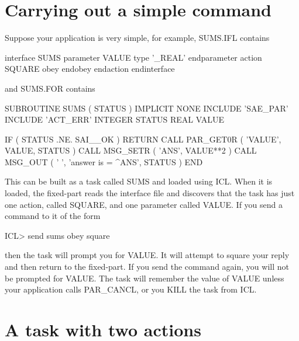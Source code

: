 \documentclass[twoside,11pt,nolof]{starlink}
\begin{document}
\section{Carrying out a simple command}

Suppose your application is very simple, for example, SUMS.IFL contains

\begin{small}
\begin{terminalv}
interface SUMS
   parameter VALUE
      type '_REAL'
   endparameter
   action SQUARE
      obey
      endobey
   endaction
endinterface
\end{terminalv}
\end{small}

and SUMS.FOR contains

\begin{small}
\begin{terminalv}
      SUBROUTINE SUMS ( STATUS )
      IMPLICIT NONE
      INCLUDE 'SAE_PAR'
      INCLUDE 'ACT_ERR'
      INTEGER STATUS
      REAL VALUE

      IF ( STATUS .NE. SAI__OK ) RETURN
      CALL PAR_GET0R ( 'VALUE', VALUE, STATUS )
      CALL MSG_SETR ( 'ANS', VALUE**2 )
      CALL MSG_OUT ( ' ', 'answer is = ^ANS', STATUS )
      END
\end{terminalv}
\end{small}

This can be built as a task called SUMS and loaded using ICL. When it is
loaded, the fixed-part reads the interface file and discovers that the
task has just one action, called SQUARE, and one parameter called VALUE.
If you send a command to it of the form

\begin{small}
\begin{terminalv}
ICL> send sums obey square
\end{terminalv}
\end{small}

then the task will prompt you for VALUE. It will attempt to square your
reply and then return to the fixed-part. If you send the command again,
you will not be prompted for VALUE. The task will remember the value of
VALUE unless your application calls PAR\_CANCL, or you KILL the task
from ICL.

\section{A task with two actions}
\end{document}

